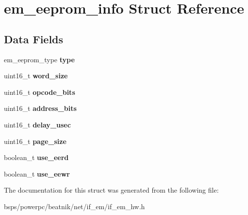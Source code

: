 \hypertarget{structem__eeprom__info}{}\section{em\+\_\+eeprom\+\_\+info Struct Reference}
\label{structem__eeprom__info}
\subsection*{Data Fields}
\begin{DoxyCompactItemize}
\item 
\mbox{\label{structem__eeprom__info_aa6b99ac973f11ce0bddfe2c858423ff8}} 
em\+\_\+eeprom\+\_\+type {\bfseries type}
\item 
\mbox{\label{structem__eeprom__info_ae480690d3be98e666948adc7e29e6b73}} 
uint16\+\_\+t {\bfseries word\+\_\+size}
\item 
\mbox{\label{structem__eeprom__info_a0e40d38c59e6aa350f9272b7f8f02c47}} 
uint16\+\_\+t {\bfseries opcode\+\_\+bits}
\item 
\mbox{\label{structem__eeprom__info_a66a36f2f0aa7a44c5b6268ca1fdc4a42}} 
uint16\+\_\+t {\bfseries address\+\_\+bits}
\item 
\mbox{\label{structem__eeprom__info_ab1fcacb1dac8c359062e77f78b9cc85f}} 
uint16\+\_\+t {\bfseries delay\+\_\+usec}
\item 
\mbox{\label{structem__eeprom__info_a0e2eabfbd506bf497380ebfcf1323836}} 
uint16\+\_\+t {\bfseries page\+\_\+size}
\item 
\mbox{\label{structem__eeprom__info_aa39d0e775bd6180a04cd56baba4c078f}} 
boolean\+\_\+t {\bfseries use\+\_\+eerd}
\item 
\mbox{\label{structem__eeprom__info_af6cb2b8bb36264f0d8d78c03d3a26b1e}} 
boolean\+\_\+t {\bfseries use\+\_\+eewr}
\end{DoxyCompactItemize}


The documentation for this struct was generated from the following file\+:\begin{DoxyCompactItemize}
\item 
bsps/powerpc/beatnik/net/if\+\_\+em/if\+\_\+em\+\_\+hw.\+h\end{DoxyCompactItemize}
